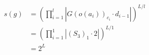 \documentclass[preview]{standalone}
\begin{document}
\begin{align*}
s(g) &= \left(\prod_{i=1}^{l}\left|G(o(a_i))_{c_i}\cdot d_{i-1}\right|\right)^{L/l} \\   &= \left(\prod_{i=1}^{1}\left|\left(S_3\right)_{1}\cdot 2\right|\right)^{L/1} \\   &= 2^{L}
\end{align*}
\end{document}
